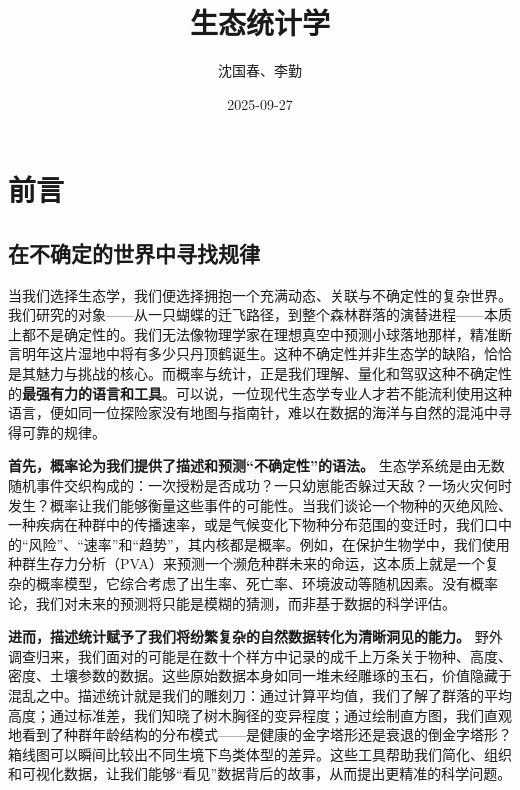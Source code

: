 \documentclass[
]{book}
\title{生态统计学}
\author{沈国春、李勤}
\date{2025-09-27}
\begin{document}
\maketitle

{
\setcounter{tocdepth}{1}
\tableofcontents
}
\hypertarget{ux524dux8a00}{%
\chapter*{前言}\label{ux524dux8a00}}

\hypertarget{ux5728ux4e0dux786eux5b9aux7684ux4e16ux754cux4e2dux5bfbux627eux89c4ux5f8b}{%
\section{在不确定的世界中寻找规律}\label{ux5728ux4e0dux786eux5b9aux7684ux4e16ux754cux4e2dux5bfbux627eux89c4ux5f8b}}

当我们选择生态学，我们便选择拥抱一个充满动态、关联与不确定性的复杂世界。我们研究的对象------从一只蝴蝶的迁飞路径，到整个森林群落的演替进程------本质上都不是确定性的。我们无法像物理学家在理想真空中预测小球落地那样，精准断言明年这片湿地中将有多少只丹顶鹤诞生。这种不确定性并非生态学的缺陷，恰恰是其魅力与挑战的核心。而概率与统计，正是我们理解、量化和驾驭这种不确定性的\textbf{最强有力的语言和工具}。可以说，一位现代生态学专业人才若不能流利使用这种语言，便如同一位探险家没有地图与指南针，难以在数据的海洋与自然的混沌中寻得可靠的规律。

\textbf{首先，概率论为我们提供了描述和预测``不确定性''的语法。} 生态学系统是由无数随机事件交织构成的：一次授粉是否成功？一只幼崽能否躲过天敌？一场火灾何时发生？概率让我们能够衡量这些事件的可能性。当我们谈论一个物种的灭绝风险、一种疾病在种群中的传播速率，或是气候变化下物种分布范围的变迁时，我们口中的``风险''、``速率''和``趋势''，其内核都是概率。例如，在保护生物学中，我们使用种群生存力分析（PVA）来预测一个濒危种群未来的命运，这本质上就是一个复杂的概率模型，它综合考虑了出生率、死亡率、环境波动等随机因素。没有概率论，我们对未来的预测将只能是模糊的猜测，而非基于数据的科学评估。

\textbf{进而，描述统计赋予了我们将纷繁复杂的自然数据转化为清晰洞见的能力。} 野外调查归来，我们面对的可能是在数十个样方中记录的成千上万条关于物种、高度、密度、土壤参数的数据。这些原始数据本身如同一堆未经雕琢的玉石，价值隐藏于混乱之中。描述统计就是我们的雕刻刀：通过计算平均值，我们了解了群落的平均高度；通过标准差，我们知晓了树木胸径的变异程度；通过绘制直方图，我们直观地看到了种群年龄结构的分布模式------是健康的金字塔形还是衰退的倒金字塔形？箱线图可以瞬间比较出不同生境下鸟类体型的差异。这些工具帮助我们简化、组织和可视化数据，让我们能够``看见''数据背后的故事，从而提出更精准的科学问题。
\end{document}
